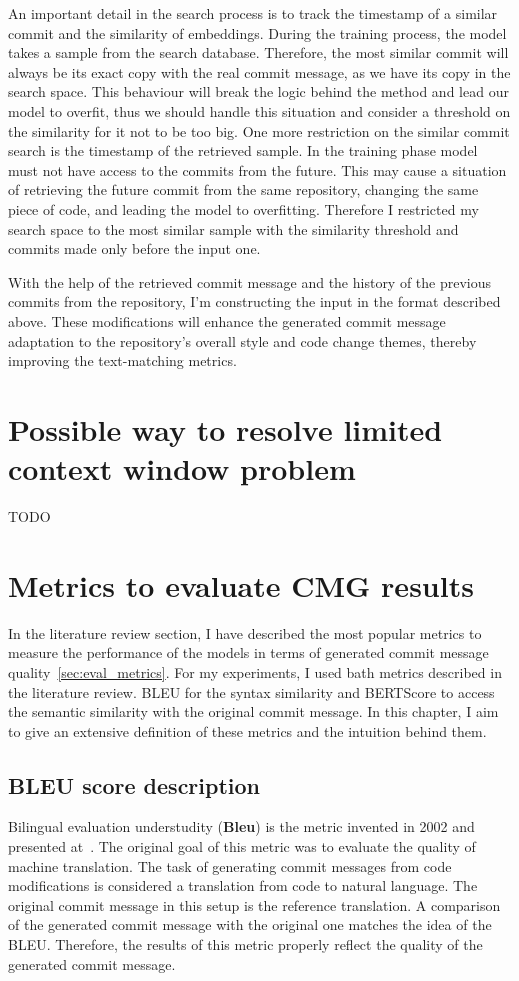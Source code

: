 An important detail in the search process is to track the timestamp of a similar commit and the similarity of embeddings.  During the training process, the model takes a sample from the search database. Therefore, the most similar commit will always be its exact copy with the real commit message, as we have its copy in the search space. This behaviour will break the logic behind the method and lead our model to overfit, thus we should handle this situation and consider a threshold on the similarity for it not to be too big. One more restriction on the similar commit search is the timestamp of the retrieved sample. In the training phase model must not have access to the commits from the future.  This may cause a situation of retrieving the future commit from the same repository, changing the same piece of code, and leading the model to overfitting. Therefore I restricted my search space to the most similar sample with the similarity threshold and commits made only before the input one.  

With the help of the retrieved commit message and the history of the previous commits from the repository, I'm constructing the input in the format described above. These modifications will enhance the generated commit message adaptation to the repository's overall style and code change themes, thereby improving the text-matching metrics.





\section{Possible way to resolve limited context window problem}\label{sec:file_attention_arch}
TODO

\section{Metrics to evaluate CMG results}
In the literature review section, I have described the most popular metrics to measure the performance of the models in terms of generated commit message quality~\ref{sec:eval_metrics}. For my experiments, I used bath metrics described in the literature review. BLEU for the syntax similarity and BERTScore to access the semantic similarity with the original commit message. In this chapter, I aim to give an extensive definition of these metrics and the intuition behind them.

\subsection{BLEU score description}\label{subsec:bleu}
Bilingual evaluation understudity (\textbf{Bleu}) is the metric invented in 2002 and presented at~\cite{papineni2002bleu}. The original goal of this metric was to evaluate the quality of machine translation. The task of generating commit messages from code modifications is considered a translation from code to natural language. The original commit message in this setup is the reference translation. A comparison of the generated commit message with the original one matches the idea of the BLEU\@. Therefore, the results of this metric properly reflect the quality of the generated commit message. 

